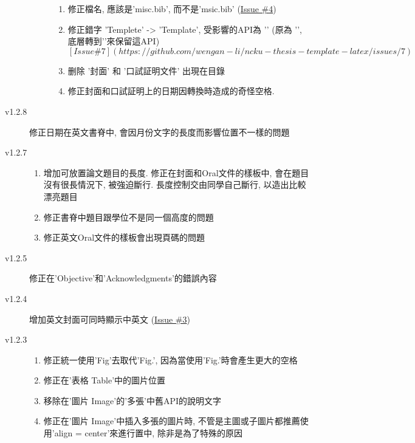 \begin{description}
\begin{description}
\begin{enumerate}
          \item 修正檔名, 應該是'misc.bib', 而不是'msic.bib' (\href{https://github.com/wengan-li/ncku-thesis-template-latex/issues/4}{Issue \#4})
          \item 修正錯字 'Templete' -> 'Template', 受影響的API為 '\texttt{\DisplayOralTemplate}' (原為 '\texttt{\DisplayOralTemplete}', 底層轉到'\texttt{\DisplayOralTemplate}'來保留這API) \([Issue \#7](https://github.com/wengan-li/ncku-thesis-template-latex/issues/7)\)
          \item 删除 '封面' 和 '口試証明文件' 出現在目錄
          \item 修正封面和口試証明上的日期因轉換時造成的奇怪空格.
        \end{enumerate}
    \end{description}

  \item[v1.2.8] 修正日期在英文書脊中, 會因月份文字的長度而影響位置不一樣的問題

  \item[v1.2.7] \hfill
    \begin{enumerate}
      \item 增加可放置論文題目的長度. 修正在封面和Oral文件的樣板中, 會在題目沒有很長情況下, 被強迫斷行. 長度控制交由同學自己斷行, 以造出比較漂亮題目
      \item 修正書脊中題目跟學位不是同一個高度的問題
      \item 修正英文Oral文件的樣板會出現頁碼的問題
    \end{enumerate}

  \item[v1.2.5] 修正在'Objective'和'Acknowledgments'的錯誤內容

  \item[v1.2.4] 增加英文封面可同時顯示中英文 (\href{https://github.com/wengan-li/ncku-thesis-template-latex/issues/3}{Issue \#3})

  \item[v1.2.3] \hfill
    \begin{enumerate}
      \item 修正統一使用'Fig'去取代'Fig.', 因為當使用'Fig.'時會產生更大的空格
      \item 修正在'表格 Table'中的圖片位置
      \item 移除在'圖片 Image'的'多張'中舊API的說明文字
      \item 修正在'圖片 Image'中插入多張的圖片時, 不管是主圖或子圖片都推薦使用'align = center'來進行置中, 除非是為了特殊的原因
    \end{enumerate}


\end{description}
